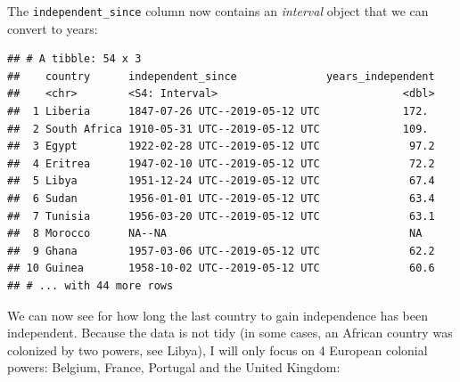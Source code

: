 \documentclass[]{gitbook}
\newenvironment{Shaded}{\begin{snugshade}}{\end{snugshade}}
\newcommand{\DataTypeTok}[1]{\textcolor[rgb]{0.13,0.29,0.53}{#1}}
\newcommand{\KeywordTok}[1]{\textcolor[rgb]{0.13,0.29,0.53}{\textbf{#1}}}
\newcommand{\NormalTok}[1]{#1}
\newcommand{\OperatorTok}[1]{\textcolor[rgb]{0.81,0.36,0.00}{\textbf{#1}}}
\newcommand{\StringTok}[1]{\textcolor[rgb]{0.31,0.60,0.02}{#1}}
\begin{document}
The \texttt{independent\_since} column now contains an \emph{interval} object that we can convert to years:

\begin{Shaded}
\end{Shaded}

\begin{verbatim}
## # A tibble: 54 x 3
##    country      independent_since              years_independent
##    <chr>        <S4: Interval>                             <dbl>
##  1 Liberia      1847-07-26 UTC--2019-05-12 UTC             172. 
##  2 South Africa 1910-05-31 UTC--2019-05-12 UTC             109. 
##  3 Egypt        1922-02-28 UTC--2019-05-12 UTC              97.2
##  4 Eritrea      1947-02-10 UTC--2019-05-12 UTC              72.2
##  5 Libya        1951-12-24 UTC--2019-05-12 UTC              67.4
##  6 Sudan        1956-01-01 UTC--2019-05-12 UTC              63.4
##  7 Tunisia      1956-03-20 UTC--2019-05-12 UTC              63.1
##  8 Morocco      NA--NA                                      NA  
##  9 Ghana        1957-03-06 UTC--2019-05-12 UTC              62.2
## 10 Guinea       1958-10-02 UTC--2019-05-12 UTC              60.6
## # ... with 44 more rows
\end{verbatim}

We can now see for how long the last country to gain independence has been independent.
Because the data is not tidy (in some cases, an African country was colonized by two powers,
see Libya), I will only focus on 4 European colonial powers: Belgium, France, Portugal and the United Kingdom:
\end{document}

